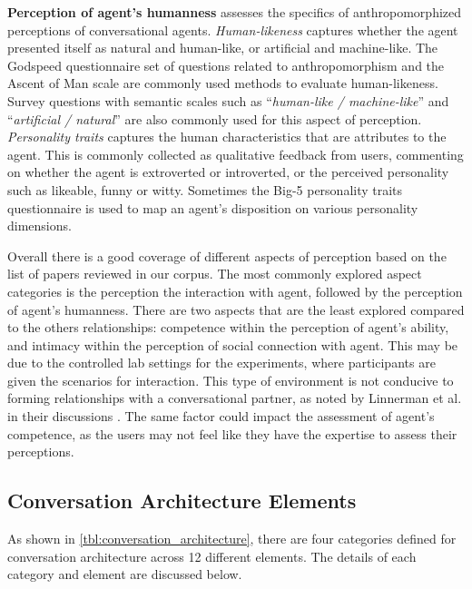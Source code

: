 \textbf{Perception of agent's humanness} assesses the specifics of anthropomorphized perceptions of conversational agents. \textit{Human-likeness} captures whether the agent presented itself as natural and human-like, or artificial and machine-like. The Godspeed questionnaire \cite{bartneck2009measurement} set of questions related to anthropomorphism and the Ascent of Man scale \cite{kteily2015ascent} are commonly used methods to evaluate human-likeness. Survey questions with semantic scales such as ``\textit{human-like / machine-like}'' and ``\textit{artificial / natural}'' are also commonly used for this aspect of perception. \textit{Personality traits} captures the human characteristics that are attributes to the agent. This is commonly collected as qualitative feedback from users, commenting on whether the agent is extroverted or introverted, or the perceived personality such as likeable, funny or witty. Sometimes the Big-5 personality traits questionnaire \cite{gosling2003very} is used to map an agent's disposition on various personality dimensions.

Overall there is a good coverage of different aspects of perception based on the list of papers reviewed in our corpus. The most commonly explored aspect categories is the perception the interaction with agent, followed by the perception of agent's humanness. There are two aspects that are the least explored compared to the others relationships: competence within the perception of agent's ability, and intimacy within the perception of social connection with agent. This may be due to the controlled lab settings for the experiments, where participants are given the scenarios for interaction. This type of environment is not conducive to forming relationships with a conversational partner, as noted by Linnerman et al. in their discussions \cite{linnemann2018can}\cmt{[15]}. The same factor could impact the assessment of agent's competence, as the users may not feel like they have the expertise to assess their perceptions. 




\subsection{Conversation Architecture Elements}

As shown in \autoref{tbl:conversation_architecture}, there are four categories defined for conversation architecture across 12 different elements. The details of each category and element are discussed below.

